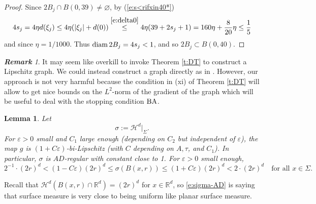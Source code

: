 \documentclass[11pt]{amsart}
\newcommand{\R}{{\mathbb R}}       %
\newcommand{\HH}{{\mathcal H}}
\newcommand{\diam}{\mathop{\rm diam}}
\newcommand{\dist}{{\rm dist}}
\newcommand{\rf}[1]{{(\ref{#1})}}
\newcommand{\ve}{{\varepsilon}}
\newtheorem{lemma}[theorem]{Lemma}
\theoremstyle{definition}
\theoremstyle{remark}
\newtheorem{rem}[theorem]{\bf Remark}
\def\BA{{\rm BA}}
\numberwithin{equation}{section}
\def\cH{{\mathcal{H}}}
\def\lec{\lesssim}
\def\lec{\lesssim}
\begin{document}
\begin{proof}
Since $2B_{j}\cap B(0,39)\neq\varnothing$, by \rf{e:s<rifxin40*}
\[
4s_{j} 
=4\eta d(\xi_{j})
\leq 4\eta (|\xi_{j}|+d(0))
\stackrel{\eqref{e:delta0}}{\leq} 4\eta(39+2s_{j}+1)
=160\eta + \frac{8}{20}\eta\le \frac{1}{5} \]
and since $\eta=1/1000$. Thus $\diam 2B_{j} =4s_{j}<1$, and so $2B_{j}\subset B(0,40)$. 
\end{proof}


\begin{rem}
	It may seem like overkill to invoke Theorem \ref{t:DT} to construct a Lipschitz graph. We could instead construct a graph directly as in \cite{DS}. However, our approach is not very harmful because the condition in (xi)  of Theorem \ref{t:DT} will allow to get nice bounds on the $L^{2}$-norm of the gradient of the graph which will be useful to deal with the
	stopping condition $\BA$.
%
\end{rem}



\begin{lemma}\label{lem-sigma-AD} 
Let
\[
\sigma:= \HH^{d}|_{\Sigma}.
\]
For $\ve>0$ small and $C_{1}$ large enough (depending on $C_{2}$ but independent of $\ve$), the map $g$ is $(1+C\ve)$-bi-Lipschitz (with $C$ depending on $A,\tau$, and $C_{1}$). In particular, $\sigma$ is $AD$-regular with constant close to 1. For $\ve>0$ small enough, 
	\begin{equation}
\label{e:sigma-AD}
2^{-1} \cdot(2r)^{d} < (1-C\ve)(2r)^{d}\leq \sigma(B(x,r))\leq (1+C\ve) (2r)^{d}<2 \cdot(2r)^{d}\quad
\mbox{for all $x\in\Sigma$.}
\end{equation}
\end{lemma}

Recall that $\cH^{d}(B(x,r)\cap \R^{d})=(2r)^{d}$ for $x\in \R^{d}$, so \eqref{e:sigma-AD} is saying that surface measure is very close to being uniform like planar surface measure.
\end{document}
